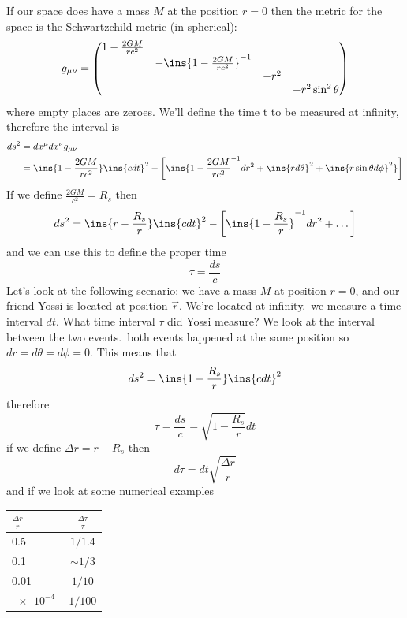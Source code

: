 If our space does have a mass \(M\) at the position \(r=0\) then the metric for the space is the Schwartzchild metric (in spherical):
\begin{equation}
    g_{\mu\nu} = \begin{pmatrix}
        1-\frac{2GM}{rc^2}&&&\\
        &-\ins{1-\frac{2GM}{rc^2}}^{-1}&&\\
        &&-r^2&\\
        &&&-r^2\sin^2\theta
    \end{pmatrix}
\end{equation}
where empty places are zeroes. We'll define the time t to be measured at infinity, therefore the interval is
\begin{align}
    ds^2 &= dx^\mu dx^\nu g_{\mu\nu}\\
    &= \ins{1-\frac{2GM}{rc^2}}\ins{cdt}^2 - \left[\ins{1-\frac{2GM}{rc^2}^{-1}dr^2 + \ins{rd\theta}^2+\ins{r\sin\theta d\phi}^2}\right]
\end{align}
If we define \(\frac{2GM}{c^2} = R_s\) then
\begin{equation}
    ds^2 = \ins{r-\frac{R_s}{r}}\ins{cdt}^2 - \left[\ins{1-\frac{R_s}{r}}^{-1}dr^2+\dots\right]
\end{equation}
and we can use this to define the proper time
\begin{equation}
    \tau = \frac{ds}{c}
\end{equation}
Let's look at the following scenario: we have a mass \(M\) at position \(r=0\), and our friend Yossi is located at position \(\vec{r}\). We're located at infinity.\ we measure a time interval \(dt\). What time interval \(\tau \) did Yossi measure? We look at the interval between the two events.\ both events happened at the same position so \(dr = d\theta = d\phi = 0\). This means that
\begin{equation}
    ds^2 = \ins{1-\frac{R_s}{r}}\ins{cdt}^2
\end{equation}
therefore\begin{equation}
    \tau = \frac{ds}{c} = \sqrt{1-\frac{R_s}{r}}dt
\end{equation}
if we define \(\Delta r = r-R_s\) then
\begin{equation}
    d\tau = dt \sqrt{\frac{\Delta r}{r}}
\end{equation}
and if we look at some numerical examples
\begin{table}[!htb]
    \centering
    \begin{tabular}{l|c}
        \(\frac{\Delta r}{r}\) & \(\frac{\Delta \tau}{\tau}\) \\
        \hline
        0.5 & \(1/1.4\) \\
        0.1 & \(\sim 1/3\) \\
        0.01 & \(1/10\) \\
        \(\qty{e-4}{}\) & \(1/100\) 
    \end{tabular}
\end{table}

